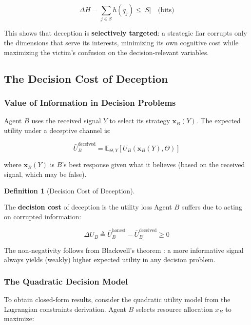 \documentclass[11pt]{article}
\theoremstyle{plain}
\theoremstyle{definition}
\newtheorem{definition}{Definition}
\theoremstyle{remark}
\let\origsubsection\subsection
\renewcommand{\subsection}{\needspace{7\baselineskip}\origsubsection}
\let\origsubsubsection\subsubsection
\renewcommand{\subsubsection}{\needspace{4\baselineskip}\origsubsubsection}
\begin{document}
\[\Delta H = \sum_{j \in S} h(q_j) \leq |S| \quad \text{(bits)}\]

This shows that deception is \textbf{selectively targeted}: a strategic
liar corrupts only the dimensions that serve its interests, minimizing
its own cognitive cost while maximizing the victim's confusion on the
decision-relevant variables.

\subsection{The Decision Cost of
Deception}\label{the-decision-cost-of-deception}

\subsubsection{Value of Information in Decision
Problems}\label{value-of-information-in-decision-problems}

Agent \(B\) uses the received signal \(Y\) to select its strategy
\(\mathbf{x}_B(Y)\). The expected utility under a deceptive channel is:

\[\bar{U}_B^{\text{deceived}} = \mathbb{E}_{\Theta, Y}\left[ U_B\left(\mathbf{x}_B(Y), \Theta\right) \right]\]

where \(\mathbf{x}_B(Y)\) is \(B\)'s best response given what it
believes (based on the received signal, which may be false).

\begin{definition}[Decision Cost of Deception]
\label{def-decision-cost-deception}

The \textbf{decision cost} of deception is the utility loss Agent $B$ suffers due to acting on corrupted information:

$$\Delta U_B \triangleq \bar{U}_B^{\text{honest}} - \bar{U}_B^{\text{deceived}} \geq 0$$
\end{definition}

The non-negativity follows from Blackwell's theorem
\citeyearpar{Blackwell1953}: a more informative signal always yields
(weakly) higher expected utility in any decision problem.

\subsubsection{The Quadratic Decision
Model}\label{the-quadratic-decision-model}

To obtain closed-form results, consider the quadratic utility model from
the Lagrangian constraints derivation. Agent \(B\) selects resource
allocation \(x_B\) to maximize:
\end{document}
